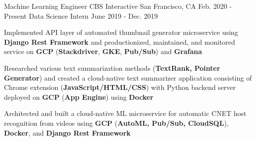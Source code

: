 

\begin{cventries}

\cventryupdate
    {Machine Learning Engineer} %
    {CBS Interactive} %
    {San Francisco, CA} %
    {Feb. 2020 - Present} %
    {Data Science Intern} %
    {June 2019 - Dec. 2019} %
    {
      \begin{cvitems} %
 		\item {Implemented API layer of automated thumbnail generator microservice using \textbf{Django Rest Framework} and productionized, maintained, and monitored service on \textbf{GCP} (\textbf{Stackdriver}, \textbf{GKE}, \textbf{Pub/Sub}) and \textbf{Grafana}}
 		\item {Researched various text summarization methods (\textbf{TextRank, Pointer Generator}) and created a cloud-native text summarizer application consisting of Chrome extension (\textbf{JavaScript/HTML/CSS}) with Python backend server deployed on \textbf{GCP} (\textbf{App Engine}) using \textbf{Docker}}
  		\item {Architected and built a cloud-native ML microservice for automatic CNET host recognition from videos using \textbf{GCP} (\textbf{AutoML, Pub/Sub, CloudSQL}), \textbf{Docker}, and \textbf{Django Rest Framework}}
      \end{cvitems}
    }


\end{cventries}
